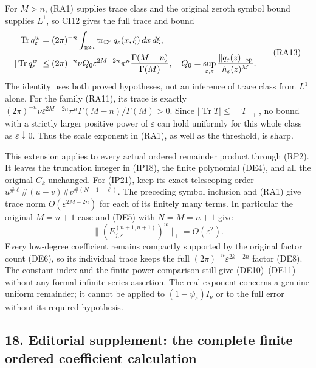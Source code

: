 \documentclass[
  11pt,
]{article}
\begin{document}
For \(M>n\), (RA1) supplies trace class and the original zeroth symbol
bound supplies \(L^1\), so CI12 gives the full trace and bound \[
\begin{aligned}
 \operatorname{Tr}q_\varepsilon^w
    &=(2\pi)^{-n}\int_{\mathbb R^{2n}}
                  \operatorname{tr}_{\mathbb C^\nu}
                          q_\varepsilon(x,\xi)\,dx\,d\xi,\\
 |\operatorname{Tr}q_\varepsilon^w|
    &\leq (2\pi)^{-n}\nu Q_0
       \varepsilon^{2M-2n}\pi^n
                         {\Gamma(M-n)\over\Gamma(M)},
 \quad
 Q_0=\sup_{\varepsilon,z}
                    {\|q_\varepsilon(z)\|_{\mathrm{op}}
                                      \over h_\varepsilon(z)^M}.
\end{aligned}
\tag{RA13}
\] The identity uses both proved hypotheses, not an inference of trace
class from \(L^1\) alone. For the family (RA11), its trace is exactly
\((2\pi)^{-n}\nu\varepsilon^{2M-2n}\pi^n\Gamma(M-n)/\Gamma(M)>0\). Since
\(|\operatorname{Tr}T|\leq\|T\|_1\), no bound with a strictly larger
positive power of \(\varepsilon\) can hold uniformly for this whole
class as \(\varepsilon\downarrow0\). Thus the scale exponent in (RA1),
as well as the threshold, is sharp.

This extension applies to every actual ordered remainder product through
(RP2). It leaves the truncation integer in (IP18), the finite polynomial
(DE4), and all the original \(C_k\) unchanged. For (IP21), keep its
exact telescoping order \(u^{\#\ell}\#(u-v)\#v^{\#(N-1-\ell)}\). The
preceding symbol inclusion and (RA1) give trace norm
\(O(\varepsilon^{2M-2n})\) for each of its finitely many terms. In
particular the original \(M=n+1\) case and (DE5) with \(N=M=n+1\) give
\[
 \|(E_{j,\varepsilon}^{(n+1,n+1)})^w\|_1
                         =O(\varepsilon^2).
 \tag{RA14}
\] Every low-degree coefficient remains compactly supported by the
original factor count (DE6), so its individual trace keeps the full
\((2\pi)^{-n}\varepsilon^{2k-2n}\) factor (DE8). The constant index and
the finite power comparison still give (DE10)--(DE11) without any formal
infinite-series assertion. The real exponent concerns a genuine uniform
remainder; it cannot be applied to \((1-\psi_\varepsilon)I_\nu\) or to
the full error without its required hypothesis.

\subsection{18. Editorial supplement: the complete finite ordered
coefficient
calculation}\label{editorial-supplement-the-complete-finite-ordered-coefficient-calculation}
\end{document}
